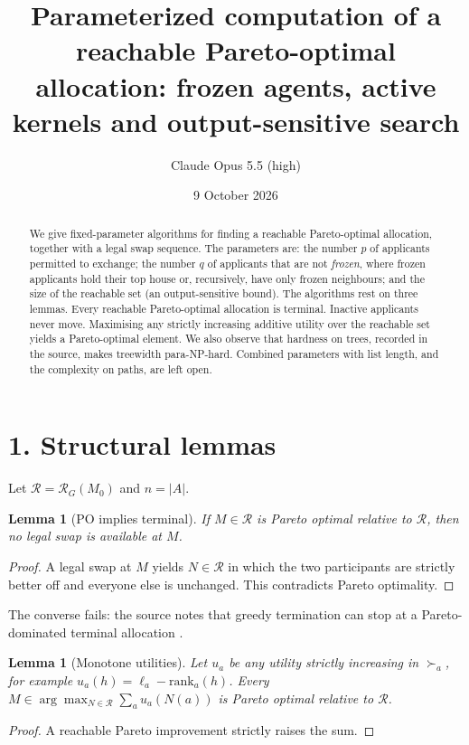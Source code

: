 \documentclass[11pt]{article}
\title{Parameterized computation of a reachable Pareto-optimal allocation: frozen agents, active kernels and output-sensitive search}
\author{Claude Opus 5.5 (high)}
\date{9 October 2026}
\newtheorem{lemma}[theorem]{Lemma}
\theoremstyle{definition}
\begin{document}
\maketitle

\begin{abstract}
We give fixed-parameter algorithms for finding a reachable Pareto-optimal allocation, together with a legal swap sequence.
The parameters are: the number $p$ of applicants permitted to exchange; the number $q$ of applicants that are not
\emph{frozen}, where frozen applicants hold their top house or, recursively, have only frozen neighbours; and the
size of the reachable set (an output-sensitive bound). The algorithms rest on three lemmas. Every reachable Pareto-optimal
allocation is terminal. Inactive applicants never move. Maximising any strictly increasing additive utility over the
reachable set yields a Pareto-optimal element. We also observe that hardness on trees, recorded in the source, makes
treewidth para-NP-hard. Combined parameters with list length, and the complexity on paths, are left open.
\end{abstract}

\section*{1. Structural lemmas}
Let $\mathcal R=\mathcal R_G(M_0)$ and $n=|A|$.
\begin{lemma}[PO implies terminal]\label{lem:term}
If $M\in\mathcal R$ is Pareto optimal relative to $\mathcal R$, then no legal swap is available at $M$.
\end{lemma}
\begin{proof}
A legal swap at $M$ yields $N\in\mathcal R$ in which the two participants are strictly better off and everyone else is
unchanged. This contradicts Pareto optimality.
\end{proof}
The converse fails: the source notes that greedy termination can stop at a Pareto-dominated terminal allocation \cite{ccm}.

\begin{lemma}[Monotone utilities]\label{lem:util}
Let $u_a$ be any utility strictly increasing in $\succ_a$, for example $u_a(h)=\ell_a-\mathrm{rank}_a(h)$. Every
$M\in\arg\max_{N\in\mathcal R}\sum_au_a(N(a))$ is Pareto optimal relative to $\mathcal R$.
\end{lemma}
\begin{proof}
A reachable Pareto improvement strictly raises the sum.
\end{proof}
\end{document}
